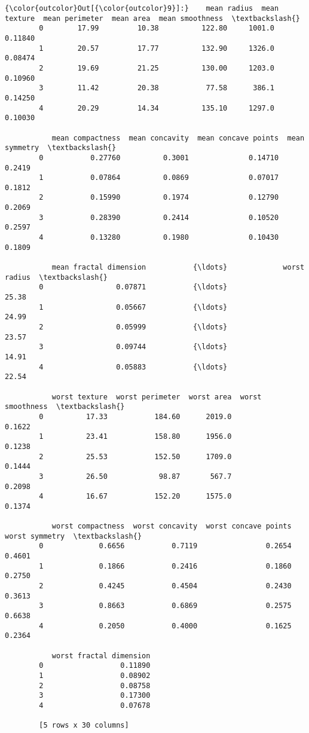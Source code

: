 \documentclass[11pt]{article}
\begin{document}
\begin{Verbatim}[commandchars=\\\{\}]
{\color{outcolor}Out[{\color{outcolor}9}]:}    mean radius  mean texture  mean perimeter  mean area  mean smoothness  \textbackslash{}
        0        17.99         10.38          122.80     1001.0          0.11840   
        1        20.57         17.77          132.90     1326.0          0.08474   
        2        19.69         21.25          130.00     1203.0          0.10960   
        3        11.42         20.38           77.58      386.1          0.14250   
        4        20.29         14.34          135.10     1297.0          0.10030   
        
           mean compactness  mean concavity  mean concave points  mean symmetry  \textbackslash{}
        0           0.27760          0.3001              0.14710         0.2419   
        1           0.07864          0.0869              0.07017         0.1812   
        2           0.15990          0.1974              0.12790         0.2069   
        3           0.28390          0.2414              0.10520         0.2597   
        4           0.13280          0.1980              0.10430         0.1809   
        
           mean fractal dimension           {\ldots}             worst radius  \textbackslash{}
        0                 0.07871           {\ldots}                    25.38   
        1                 0.05667           {\ldots}                    24.99   
        2                 0.05999           {\ldots}                    23.57   
        3                 0.09744           {\ldots}                    14.91   
        4                 0.05883           {\ldots}                    22.54   
        
           worst texture  worst perimeter  worst area  worst smoothness  \textbackslash{}
        0          17.33           184.60      2019.0            0.1622   
        1          23.41           158.80      1956.0            0.1238   
        2          25.53           152.50      1709.0            0.1444   
        3          26.50            98.87       567.7            0.2098   
        4          16.67           152.20      1575.0            0.1374   
        
           worst compactness  worst concavity  worst concave points  worst symmetry  \textbackslash{}
        0             0.6656           0.7119                0.2654          0.4601   
        1             0.1866           0.2416                0.1860          0.2750   
        2             0.4245           0.4504                0.2430          0.3613   
        3             0.8663           0.6869                0.2575          0.6638   
        4             0.2050           0.4000                0.1625          0.2364   
        
           worst fractal dimension  
        0                  0.11890  
        1                  0.08902  
        2                  0.08758  
        3                  0.17300  
        4                  0.07678  
        
        [5 rows x 30 columns]
\end{Verbatim}
            
\end{document}
